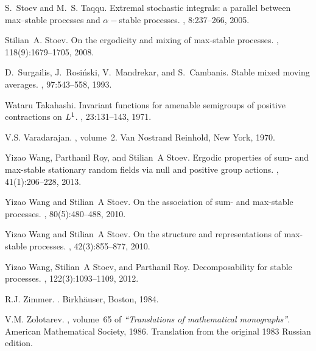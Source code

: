 \documentclass[12pt]{amsart}
\begin{document}
\begin{thebibliography}{10}
	S.~Stoev and M.~S. Taqqu.
	\newblock Extremal stochastic integrals: a parallel between max--stable
	processes and $\alpha-$stable processes.
	, 8:237--266, 2005.
	
	Stilian~A. Stoev.
	\newblock On the ergodicity and mixing of max-stable processes.
	, 118(9):1679--1705, 2008.
	
	D.~Surgailis, J.~Rosi\'nski, V.~Mandrekar, and S.~Cambanis.
	\newblock Stable mixed moving averages.
	, 97:543--558, 1993.
	
	Wataru Takahashi.
	\newblock Invariant functions for amenable semigroups of positive contractions
	on {$L\sp{1}$}.
	, 23:131--143, 1971.
	
	{V.S.} Varadarajan.
	, volume~2.
	\newblock Van Nostrand Reinhold, New York, 1970.
	
	Yizao Wang, Parthanil Roy, and Stilian~A Stoev.
	\newblock Ergodic properties of sum- and max-stable stationary random fields
	via null and positive group actions.
	, 41(1):206--228, 2013.
	
	Yizao Wang and Stilian~A Stoev.
	\newblock On the association of sum- and max-stable processes.
	, 80(5):480--488, 2010.
	
	Yizao Wang and Stilian~A Stoev.
	\newblock On the structure and representations of max-stable processes.
	, 42(3):855--877, 2010.
	
	Yizao Wang, Stilian~A Stoev, and Parthanil Roy.
	\newblock Decomposability for stable processes.
	, 122(3):1093--1109,
	2012.
	
	R.J. Zimmer.
	.
	\newblock Birkh\"auser, Boston, 1984.
	
	V.M. Zolotarev.
	, volume~65 of {\em {\rm
			``Translations of mathematical monographs''}}.
	\newblock American Mathematical Society, 1986.
	\newblock Translation from the original 1983 {R}ussian edition.
	
\end{thebibliography}
\end{document}
